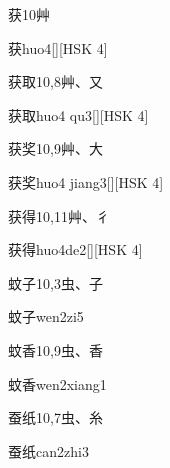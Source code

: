 \begin{entry}{获}{10}{⾋}
  \begin{phonetics}{获}{huo4}[][HSK 4]
  \end{phonetics}
\end{entry}

\begin{entry}{获取}{10,8}{⾋、⼜}
  \begin{phonetics}{获取}{huo4 qu3}[][HSK 4]
  \end{phonetics}
\end{entry}

\begin{entry}{获奖}{10,9}{⾋、⼤}
  \begin{phonetics}{获奖}{huo4 jiang3}[][HSK 4]
  \end{phonetics}
\end{entry}

\begin{entry}{获得}{10,11}{⾋、⼻}
  \begin{phonetics}{获得}{huo4de2}[][HSK 4]
  \end{phonetics}
\end{entry}

\begin{entry}{蚊子}{10,3}{⾍、⼦}
  \begin{phonetics}{蚊子}{wen2zi5}
  \end{phonetics}
\end{entry}

\begin{entry}{蚊香}{10,9}{⾍、⾹}
  \begin{phonetics}{蚊香}{wen2xiang1}
  \end{phonetics}
\end{entry}

\begin{entry}{蚕纸}{10,7}{⾍、⽷}
  \begin{phonetics}{蚕纸}{can2zhi3}
  \end{phonetics}
\end{entry}

